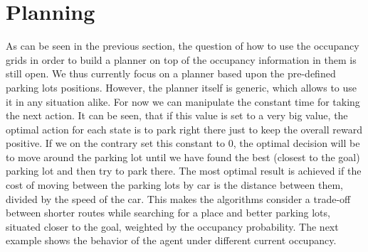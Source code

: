     \section{Planning}\label{sec:planning}
        As can be seen in the previous section, the question of how to use the occupancy grids in order to build a planner on top of the occupancy information in them is still open. We thus currently focus on a planner based upon the pre-defined parking lots positions. However, the planner itself is generic, which allows to use it in any situation alike. For now we can manipulate the constant time for taking the next action. It can be seen, that if this value is set to a very big value, the optimal action for each state is to park right there just to keep the overall reward positive. If we on the contrary set this constant to 0, the optimal decision will be to move around the parking lot until we have found the best (closest to the goal) parking lot and then try to park there.
        The most optimal result is achieved if the cost of moving between the parking lots by car is the distance between them, divided by the speed of the car. This makes the algorithms consider a trade-off between shorter routes while searching for a place and better parking lots, situated closer to the goal, weighted by the occupancy probability.
        The next example shows the behavior of the agent under different current occupancy.
